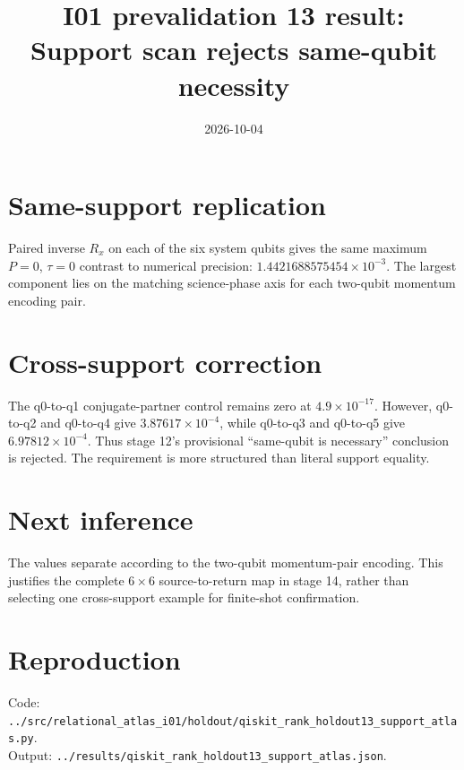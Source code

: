 \documentclass[11pt]{article}
\begin{document}
\title{I01 prevalidation 13 result:\\Support scan rejects same-qubit necessity}
\date{2026-10-04}
\maketitle

\section*{Same-support replication}
Paired inverse $R_x$ on each of the six system qubits gives the same maximum
$P=0$, $\tau=0$ contrast to numerical precision:
$1.4421688575454\times10^{-3}$. The largest component lies on the matching
science-phase axis for each two-qubit momentum encoding pair.

\section*{Cross-support correction}
The q0-to-q1 conjugate-partner control remains zero at $4.9\times10^{-17}$.
However, q0-to-q2 and q0-to-q4 give $3.87617\times10^{-4}$, while q0-to-q3
and q0-to-q5 give $6.97812\times10^{-4}$. Thus stage 12's provisional
``same-qubit is necessary'' conclusion is rejected. The requirement is more
structured than literal support equality.

\section*{Next inference}
The values separate according to the two-qubit momentum-pair encoding. This justifies
the complete $6\times6$ source-to-return map in stage 14, rather than selecting one
cross-support example for finite-shot confirmation.

\section*{Reproduction}
Code: \texttt{../src/relational\_atlas\_i01/holdout/qiskit\_rank\_holdout13\_support\_atlas.py}.\\
Output: \texttt{../results/qiskit\_rank\_holdout13\_support\_atlas.json}.
\end{document}
